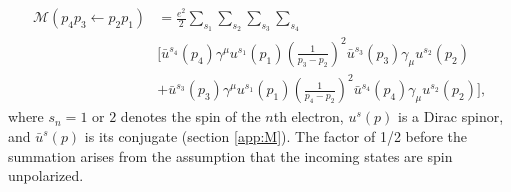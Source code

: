 \documentclass{article}
\begin{document}
\begin{equation} 
  \label{eq:M} 
  \begin{aligned} 
    \mathcal{M}(p_4p_3\leftarrow
    p_2p_1) 
    &=
    \frac{e^2}{2} \sum_{s_1}\sum_{s_2}\sum_{s_3}\sum_{s_4} 
    \\& \bigg[
      \bar{u}^{s_4}\left(p_4\right)\gamma^{\mu}u^{s_1}\left(p_1\right)
      \left(\frac{1}{p_3 - p_2}\right)^2
      \bar{u}^{s_3}\left(p_3\right)\gamma_{\mu}u^{s_2}\left(p_2\right)
      \\&+ 
      \bar{u}^{s_3}\left(p_3\right)\gamma^{\mu}u^{s_1}\left(p_1\right)
      \left(\frac{1}{p_4 - p_2}\right)^2
      \bar{u}^{s_4}\left(p_4\right)\gamma_{\mu}u^{s_2}\left(p_2\right)
    \bigg],
  \end{aligned} 
\end{equation}
%
where $s_n = 1\text{ or }2$ denotes the spin of the $n$th electron, $u^s(p)$
is a Dirac spinor, and $\bar{u}^s(p)$ is its conjugate (section \ref{app:M}).
The factor of 1/2 before the summation arises from the assumption that the
incoming states are spin unpolarized.
\end{document}
